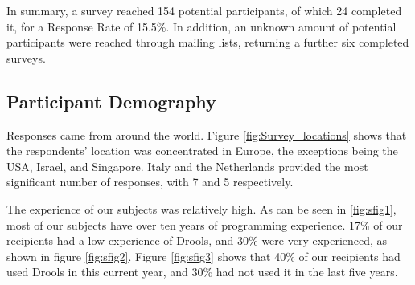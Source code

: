 In summary, a survey reached 154 potential participants, of which 24 completed it, for a Response Rate of 15.5\%.
In addition, an unknown amount of potential participants were reached through mailing lists, returning a further six completed surveys.

\subsection{Participant Demography}

Responses came from around the world.
Figure \ref{fig:Survey_locations} shows that the respondents' location was concentrated in Europe, the exceptions being the USA, Israel, and Singapore.
Italy and the Netherlands provided the most significant number of responses, with 7 and 5 respectively.

The experience of our subjects was relatively high.
As can be seen in \ref{fig:sfig1}, most of our subjects have over ten years of programming experience.
17\% of our recipients had a low experience of Drools, and 30\% were very experienced, as shown in figure \ref{fig:sfig2}.
Figure \ref{fig:sfig3} shows that 40\% of our recipients had used Drools in this current year, and 30\% had not used it in the last five years.

